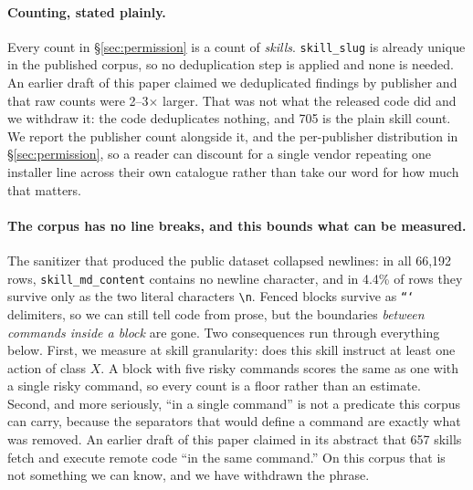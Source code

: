 \documentclass[10pt]{article}
\begin{document}
\paragraph{Counting, stated plainly.} Every count in \S\ref{sec:permission} is a
count of \emph{skills}. \texttt{skill\_slug} is already unique in the published
corpus, so no deduplication step is applied and none is needed. An earlier draft of
this paper claimed we deduplicated findings by publisher and that raw counts were
2--3$\times$ larger. That was not what the released code did and we withdraw it: the
code deduplicates nothing, and 705 is the plain skill count. We report the publisher
count alongside it, and the per-publisher distribution in \S\ref{sec:permission}, so
a reader can discount for a single vendor repeating one installer line across their
own catalogue rather than take our word for how much that matters.

\paragraph{The corpus has no line breaks, and this bounds what can be measured.} The
sanitizer that produced the public dataset collapsed newlines: in all 66,192 rows,
\texttt{skill\_md\_content} contains no newline character, and in 4.4\% of rows they
survive only as the two literal characters \texttt{\textbackslash n}. Fenced blocks
survive as \texttt{```} delimiters, so we can still tell code from prose, but the
boundaries \emph{between commands inside a block} are gone. Two consequences run
through everything below. First, we measure at skill granularity: does this skill
instruct at least one action of class $X$. A block with five risky commands scores
the same as one with a single risky command, so every count is a floor rather than an
estimate. Second, and more seriously, ``in a single command'' is not a predicate this
corpus can carry, because the separators that would define a command are exactly what
was removed. An earlier draft of this paper claimed in its abstract that 657 skills
fetch and execute remote code ``in the same command.'' On this corpus that is not
something we can know, and we have withdrawn the phrase.
\end{document}
